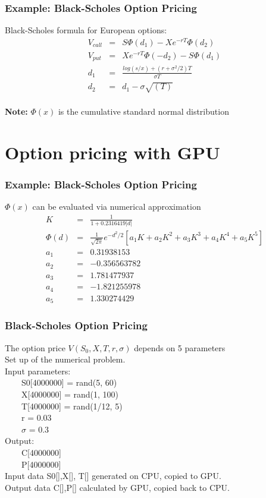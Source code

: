 \documentclass[xcolor={x11names,svgnames,dvipsnames}]{beamer}
\begin{document}
\begin{frame}
\frametitle{Example: Black-Scholes Option Pricing}

Black-Scholes formula for European options:\\
\begin{eqnarray*}
V_{call} &=& S\Phi(d_1) - X e^{-rT}\Phi(d_2)\\
V_{put} &=&  X e^{-rT}\Phi(-d_2)- S\Phi(d_1)\\
d_1 &=& \frac{log(s/x)+(r+\sigma^2/2)T}{\sigma T}\\
d_2 &=& d_1 - \sigma \sqrt{(T)}\\
\end{eqnarray*}

\textbf{Note:} $\Phi(x)$ is the cumulative standard normal distribution

\end{frame}

\section{Option pricing with GPU}
\begin{frame}
\frametitle{Example: Black-Scholes Option Pricing}

$\Phi(x)$ can be evaluated via numerical approximation 
\begin{eqnarray*}
K &=& \frac{1}{1+0.2316419|d|}\\
\Phi(d) &=& \frac{1}{\sqrt{2\pi}}e^{-d^2/2}[a_1K + a_2 K^2 + a_3 K^3 +a_4K^4 + a_5K^5]\\
a_1 &=& 0.31938153\\
a_2 &=& -0.356563782\\
a_3 &=& 1.781477937\\
a_4 &=& -1.821255978\\
a_5 &=& 1.330274429 
\end{eqnarray*}

\end{frame}

\begin{frame}
\frametitle{Black-Scholes Option Pricing }
The option price $V(S_0, X, T, r, \sigma)$ depends on 5 parameters\\
Set up of the numerical problem.\\
Input parameters:\\
\ \ \ \ S0[4000000] = rand(5, 60)\\
\ \ \ \ X[4000000] = rand(1, 100)\\
\ \ \ \ T[4000000] = rand(1/12, 5)\\
\ \ \ \ r = 0.03\\
\ \ \ \ $\sigma$ = 0.3\\
Output:\\
\ \ \ \ C[4000000]\\
\ \ \ \ P[4000000]\\
Input data S0[],X[], T[] generated on CPU, copied to GPU.\\
Output data C[],P[] calculated by GPU, copied back to CPU.
\end{frame}
\end{document}
